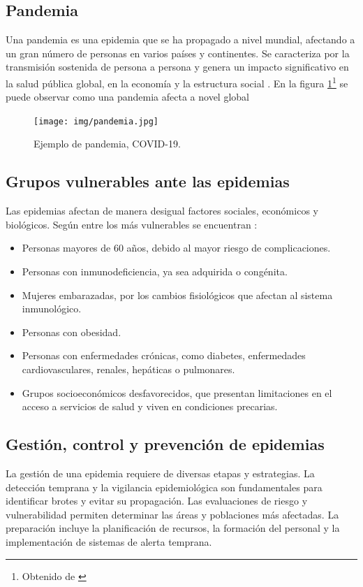 \subsection{Pandemia}
Una pandemia es una epidemia que se ha propagado a nivel mundial, afectando a un gran número de personas en varios países y continentes. Se caracteriza por la transmisión sostenida de persona a persona y genera un impacto significativo en la salud pública global, en la economía y la estructura social \cite{dias2024towards}. En la figura \ref{fig:pandemia}\footnote{Obtenido de \cite{isglobal_coronavirus_orden}} se puede observar como una pandemia afecta a novel global

\begin{figure}[H]
    \centering
    \texttt{[image: img/pandemia.jpg]}
    \caption{Ejemplo de pandemia, COVID-19.}
    \label{fig:pandemia}
    \vspace{0.5cm} %
\end{figure}

\subsection{Grupos vulnerables ante las epidemias}
Las epidemias afectan de manera desigual factores sociales, económicos y biológicos. Según \cite{nasution2021poblaciones} entre los más vulnerables se encuentran :
\begin{itemize}
  \item Personas mayores de 60 años, debido al mayor riesgo de complicaciones.
  \item Personas con inmunodeficiencia, ya sea adquirida o congénita.
  \item Mujeres embarazadas, por los cambios fisiológicos que afectan al sistema inmunológico.
   \item Personas con obesidad.
   \item Personas con enfermedades crónicas, como diabetes, enfermedades cardiovasculares, renales, hepáticas o pulmonares.
   \item Grupos socioeconómicos desfavorecidos, que presentan limitaciones en el acceso a servicios de salud y viven en condiciones precarias. 
\end{itemize}

\subsection{Gestión, control y prevención de epidemias}
La gestión de una epidemia requiere de diversas etapas y estrategias. La detección temprana y la vigilancia epidemiológica son fundamentales para identificar brotes y evitar su propagación. Las evaluaciones de riesgo y vulnerabilidad permiten determinar las áreas y poblaciones más afectadas. La preparación incluye la planificación de recursos, la formación del personal y la implementación de sistemas de alerta temprana.

